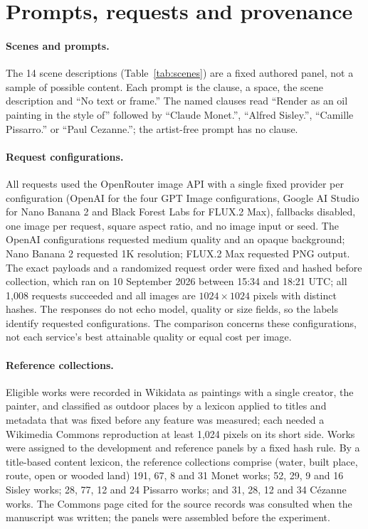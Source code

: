 \section{Prompts, requests and provenance}\label{app:provenance}



\paragraph{Scenes and prompts.}
The 14 scene descriptions (Table~\ref{tab:scenes}) are a fixed authored panel, not a sample of
possible content. Each prompt is the clause, a space, the scene description and ``No text or
frame.'' The named clauses read ``Render as an oil painting in the style of'' followed by
``Claude Monet.'', ``Alfred Sisley.'', ``Camille Pissarro.'' or ``Paul Cezanne.''; the
artist-free prompt has no clause.

\paragraph{Request configurations.}
All requests used the OpenRouter image API with a single fixed provider per configuration
(OpenAI for the four GPT Image configurations, Google AI Studio for Nano Banana 2 and Black
Forest Labs for FLUX.2 Max), fallbacks disabled, one image per request, square aspect ratio,
and no image input or seed. The OpenAI configurations requested medium quality and an opaque
background; Nano Banana 2 requested 1K resolution; FLUX.2 Max requested PNG output. The exact
payloads and a randomized request order were fixed and hashed before collection, which ran on
10 September 2026 between 15:34 and 18:21 UTC; all 1,008 requests succeeded and all images are
$1024\times1024$ pixels with distinct hashes. The responses do not echo model, quality or size
fields, so the labels identify requested configurations. The comparison concerns these
configurations, not each service's best attainable quality or equal cost per image.

\paragraph{Reference collections.}
Eligible works were recorded in Wikidata as paintings with a single creator, the painter, and
classified as outdoor places by a lexicon applied to titles and metadata that was fixed before
any feature was measured; each needed a Wikimedia Commons reproduction at least 1,024 pixels on
its short side. Works were assigned to the development and reference panels by a fixed hash
rule. By a title-based content lexicon, the reference collections comprise (water, built place,
route, open or wooded land) 191, 67, 8 and 31 Monet works; 52, 29, 9 and 16 Sisley works; 28,
77, 12 and 24 Pissarro works; and 31, 28, 12 and 34 C\'ezanne works. The Commons page cited for
the source records \citep{commonsglam} was consulted when the manuscript was written; the panels
were assembled before the experiment.

